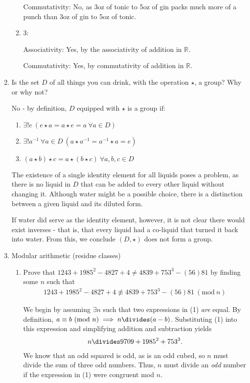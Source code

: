 \documentclass{scrartcl}
\begin{document}
\begin{enumerate}
\begin{enumerate}
					Commutativity: No, as 3oz of tonic to 5oz of gin packs much more of a punch than 3oz of gin to 5oz of tonic.
						
						\item 3: 
						
							Associativity: Yes, by the associativity of addition in $\mathbb{R}$.
							
							Commutativity: Yes, by commutativity of addition in $\mathbb{R}$.
						
		\end{enumerate}
	
	\item Is the set $D$ of all things you can drink, with the operation $\star$, a group? Why or why not?
	
		No - by definition, $D$ equipped with $\star$ is a group if:
		\begin{enumerate}
			\item $\exists ! e\ (e\star a = a\star e = a\ \forall a \in D)$
			\item $\exists ! a^{-1}\ \forall a \in D\ (a\star a^{-1} = a^{-1}\star a = e)$
			\item $(a\star b)\star c = a\star (b\star c)\ \forall a,b,c \in D$
		\end{enumerate}
		
		
		The existence of a single identity element for all liquids poses a problem, as there is no liquid in $D$ that can be added to every other liquid without changing it. Although water might be a possible choice, there is a distinction between a given liquid and its diluted form.
		
		If water did serve as the identity element, however, it is not clear there would exist inverses - that is, that every liquid had a co-liquid that turned it back into water. From this, we conclude $(D, \star)$ does not form a group.
	
	\item Modular arithmetic (residue classes)
	
	\begin{enumerate}
	
		\item Prove that $1243 + 1985^2 -4827 +4 \neq 4839 +753^3 -(56)81$ by finding some $n$ such that
		\begin{align}
			1243 + 1985^2 -4827 +4 \not\equiv 4839 +753^3 -(56)81 \ (\textrm{mod}\ n)
		\end{align}
		
		We begin by assuming $\exists n$ such that two expressions in (1) \textit{are} equal.
		By definition, $a \equiv b\ (\textrm{mod}\ n) \implies n \divides  (a-b)$. Substituting (1) into this expression and simplifying addition and subtraction yields
		\begin{align}
			n \divides 9709 + 1985^2 + 753^3.
		\end{align}
		We know that an odd squared is odd, as is an odd cubed, so $n$ must divide the sum of three odd numbers. Thus, $n$ must divide an \textit{odd} number if the expression in (1) were congruent mod $n$.
		

\end{enumerate}
\end{enumerate}
\end{document}
